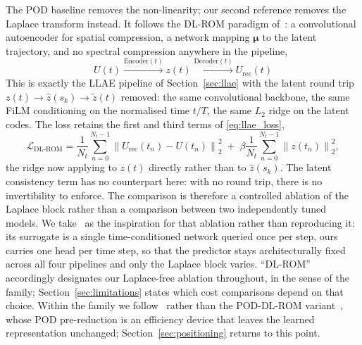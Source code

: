 ﻿\documentclass[a4paper,12pt]{article}
\theoremstyle{definition}
\theoremstyle{remark}
\newcommand{\vmu}{\bm{\mu}}
\begin{document}
The POD baseline removes the non-linearity; our second reference removes the Laplace transform instead. It follows the DL-ROM paradigm of~\cite{fresca2021}: a convolutional autoencoder for spatial compression, a network mapping $\vmu$ to the latent trajectory, and no spectral compression anywhere in the pipeline,
\begin{equation}
    U(t) \xrightarrow{\text{Encoder}(t)} z(t) \xrightarrow{\text{Decoder}(t)} U_{\text{rec}}(t)
\end{equation}
This is exactly the LLAE pipeline of Section~\ref{sec:llae} with the latent round trip $z(t) \to \hat{z}(s_k) \to \tilde{z}(t)$ removed: the same convolutional backbone, the same FiLM conditioning on the normalised time $t/T$, the same $L_2$ ridge on the latent codes. The loss retains the first and third terms of \eqref{eq:llae_loss},
\begin{equation}
    \mathcal{L}_{\mathrm{DL\text{-}ROM}} = \frac{1}{N_t}\sum_{n=0}^{N_t-1} \left\| U_{\mathrm{rec}}(t_n) - U(t_n) \right\|_2^2 \;+\; \beta \frac{1}{N_t}\sum_{n=0}^{N_t-1} \left\| z(t_n) \right\|_2^2,
    \label{eq:dlrom_loss}
\end{equation}
the ridge now applying to $z(t)$ directly rather than to $\hat{z}(s_k)$. The latent consistency term has no counterpart here: with no round trip, there is no invertibility to enforce. The comparison is therefore a controlled ablation of the Laplace block rather than a comparison between two independently tuned models. We take~\cite{fresca2021} as the inspiration for that ablation rather than reproducing it: its surrogate is a single time-conditioned network queried once per step, ours carries one head per time step, so that the predictor stays architecturally fixed across all four pipelines and only the Laplace block varies. ``DL-ROM'' accordingly designates our Laplace-free ablation throughout, in the sense of the family; Section~\ref{sec:limitations} states which cost comparisons depend on that choice. Within the family we follow~\cite{fresca2021} rather than the POD-DL-ROM variant~\cite{fresca2022}, whose POD pre-reduction is an efficiency device that leaves the learned representation unchanged; Section~\ref{sec:positioning} returns to this point.
\end{document}

